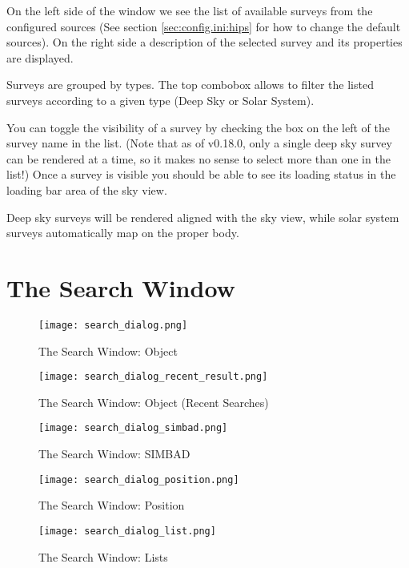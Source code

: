 On the left side of the window we see the list of available surveys from
the configured sources (See section \ref{sec:config.ini:hips} for how to
change the default sources).  On the right side a description of the selected
survey and its properties are displayed.

Surveys are grouped by types. The top combobox allows to filter the listed
surveys according to a given type (Deep Sky or Solar System).

You can toggle the visibility of a survey by checking the box on the left
of the survey name in the list.  (Note that as of v0.18.0, only a single deep
sky survey can be rendered at a time, so it makes no sense to select more than one in
the list!) Once a survey is visible you should be able to see its loading
status in the loading bar area of the sky view.

Deep sky surveys will be rendered aligned with the sky view, while solar system
surveys automatically map on the proper body.


\section{The Search Window}
\label{sec:gui:search}

\begin{figure}[p]
\centering\texttt{[image: search\_dialog.png]}
\caption{The Search Window: Object}
\label{fig:gui:search}
\end{figure}

\begin{figure}[p]
\centering\texttt{[image: search\_dialog\_recent\_result.png]}
\caption{The Search Window: Object (Recent Searches)}
\label{fig:gui:search:recentSearches}
\end{figure}

\begin{figure}[p]
\centering\texttt{[image: search\_dialog\_simbad.png]}
\caption{The Search Window: SIMBAD}
\label{fig:gui:search:simbad}
\end{figure}

\begin{figure}[p]
\centering\texttt{[image: search\_dialog\_position.png]}
\caption{The Search Window: Position}
\label{fig:gui:search:position}
\end{figure}

\begin{figure}[tbp]
\centering\texttt{[image: search\_dialog\_list.png]}
\caption{The Search Window: Lists}
\label{fig:gui:search:lists}
\end{figure}


